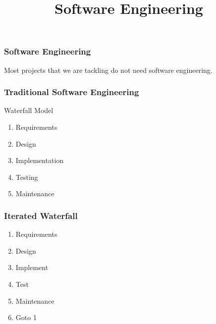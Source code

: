 
\title{Software Engineering}

\frame{\maketitle}

\begin{frame}[fragile]
\frametitle{Software Engineering}
Most projects that we are tackling do not need software engineering.

\end{frame}

\begin{frame}[fragile]
\frametitle{Traditional Software Engineering}

\begin{block}{Waterfall Model}
\begin{enumerate}
\item Requirements
\item Design
\item Implementation
\item Testing
\item Maintenance
\end{enumerate}
\end{block}
\end{frame}

\begin{frame}[fragile]
\frametitle{Iterated Waterfall}

\begin{enumerate}
\item Requirements
\item Design
\item Implement
\item Test
\item Maintenance
\item Goto 1
\end{enumerate}
\end{frame}

